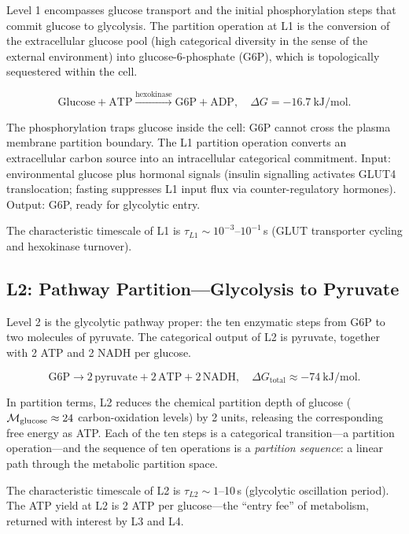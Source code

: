 Level 1 encompasses glucose transport and the initial phosphorylation steps
that commit glucose to glycolysis. The partition operation at L1 is the
conversion of the extracellular glucose pool (high categorical diversity
in the sense of the external environment) into glucose-6-phosphate (G6P),
which is topologically sequestered within the cell.

\begin{equation}
  \text{Glucose} + \mathrm{ATP} \xrightarrow{\text{hexokinase}} \text{G6P} + \mathrm{ADP},
  \quad \Delta G = -16.7\ \mathrm{kJ/mol}.
  \label{eq:hexokinase}
\end{equation}

The phosphorylation traps glucose inside the cell: G6P cannot cross the
plasma membrane partition boundary. The L1 partition operation converts an
extracellular carbon source into an intracellular categorical commitment.
Input: environmental glucose plus hormonal signals (insulin signalling activates
GLUT4 translocation; fasting suppresses L1 input flux via counter-regulatory
hormones). Output: G6P, ready for glycolytic entry.

The characteristic timescale of L1 is $\tau_{L1} \sim 10^{-3}$--$10^{-1}$\,s
(GLUT transporter cycling and hexokinase turnover).

\subsection{L2: Pathway Partition---Glycolysis to Pyruvate}
\label{ssec:L2}

Level 2 is the glycolytic pathway proper: the ten enzymatic steps from G6P
to two molecules of pyruvate. The categorical output of L2 is pyruvate,
together with 2 ATP and 2 NADH per glucose.

\begin{equation}
  \text{G6P} \to 2\,\text{pyruvate} + 2\,\mathrm{ATP} + 2\,\mathrm{NADH},
  \quad \Delta G_{\mathrm{total}} \approx -74\ \mathrm{kJ/mol}.
  \label{eq:glycolysis}
\end{equation}

In partition terms, L2 reduces the chemical partition depth of glucose
($\mathcal{M}_{\mathrm{glucose}} \approx 24$ carbon-oxidation levels) by 2 units,
releasing the corresponding free energy as ATP. Each of the ten steps is a
categorical transition---a partition operation---and the sequence of ten
operations is a \emph{partition sequence}: a linear path through the
metabolic partition space.

The characteristic timescale of L2 is $\tau_{L2} \sim 1$--10\,s (glycolytic
oscillation period). The ATP yield at L2 is 2 ATP per glucose---the ``entry
fee'' of metabolism, returned with interest by L3 and L4.

